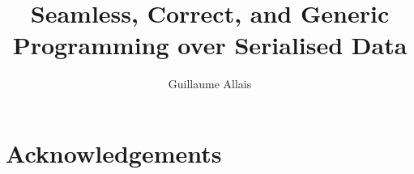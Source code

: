 \documentclass[nolinenum]{jfp}
\begin{document}

\totalpg{\pageref{lastpage01}}

\title{Seamless, Correct, and Generic Programming over Serialised Data}

\begin{authgrp}
\author{Guillaume Allais}
\end{authgrp}




\maketitle



















\section*{Acknowledgements}





\appendix



%

\label{lastpage01}
\end{document}
